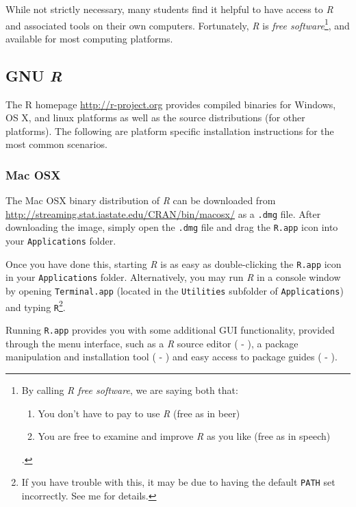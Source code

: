 \documentclass[10pt,letterpaper]{article}
\begin{document}
While not strictly necessary, many students find it helpful to have access to \emph{R} and associated tools on their own computers.  Fortunately, \emph{R} is \emph{free software}\footnote{By calling \emph{R free software}, we are saying both that: \begin{enumerate} \item You don't have to pay to use \emph{R} (free as in beer) \item You are free to examine and improve \emph{R} as you like (free as in speech)\end{enumerate}.}, and available for most computing platforms.

\subsection{GNU \emph{R}}

The R homepage \url{http://r-project.org} provides compiled binaries for Windows, OS X, and linux platforms as well as the source distributions (for other platforms).  The following are platform specific installation instructions for the most common scenarios.

\subsubsection{Mac OSX} %
\label{ssub:mac_osx}

The Mac OSX binary distribution of \emph{R} can be downloaded from  \url{http://streaming.stat.iastate.edu/CRAN/bin/macosx/} as a \texttt{.dmg} file.  After downloading the image, simply open the \texttt{.dmg} file and drag the \texttt{R.app} icon into your \texttt{Applications} folder.

Once you have done this, starting \emph{R} is as easy as double-clicking the \texttt{R.app} icon in your \texttt{Applications} folder.  Alternatively, you may run \emph{R} in a console window by opening \texttt{Terminal.app} (located in the \texttt{Utilities} subfolder of \texttt{Applications}) and typing \texttt{R}\footnote{If you have trouble with this, it may be due to having the default \texttt{PATH} set incorrectly.  See me for details.}.

Running \texttt{R.app} provides you with some additional GUI functionality,
provided through the menu interface, such as a \emph{R} source editor
( - ), a package manipulation and installation tool ( - ) and easy access to package guides ( - ).
\end{document}
